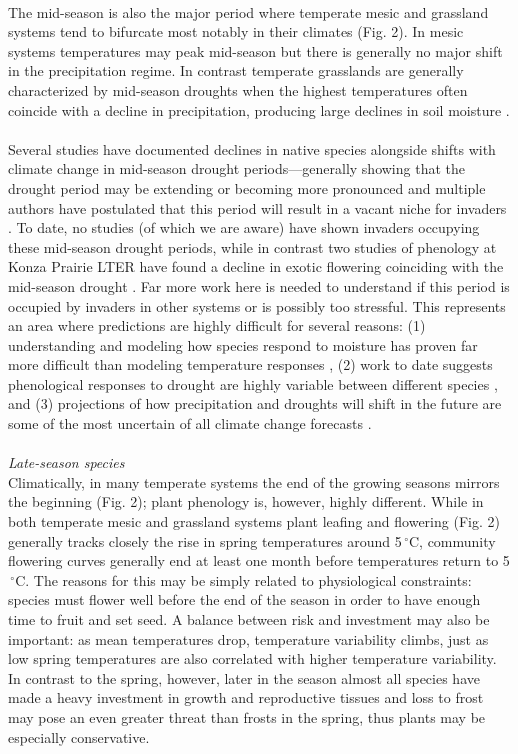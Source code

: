 \documentclass[11pt,a4paper,oneside]{article}
\begin{document}
\\
The mid-season is also the major period where temperate mesic and grassland systems tend to bifurcate most notably in their climates (Fig. 2). In mesic systems temperatures may peak mid-season but there is generally no major shift in the precipitation regime. In contrast temperate grasslands are generally characterized by mid-season droughts when the highest temperatures often coincide with a decline in precipitation, producing large declines in soil moisture \citep[e.g.,][]{Craine:2012kl}.\\
\\
Several studies have documented declines in native species alongside shifts with climate change in mid-season drought periods---generally showing that the drought period may be extending or becoming more pronounced \citep{Aldridge:2011} and multiple authors have postulated that this period will result in a vacant niche for invaders \citep{Sherry:2007fq,Aldridge:2011}. To date, no studies (of which we are aware) have shown invaders occupying these mid-season drought periods, while in contrast two studies of phenology at Konza Prairie LTER have found a decline in exotic flowering coinciding with the mid-season drought \citep{Craine:2012kl,wolkovichAmBot2013}. Far more work here is needed to understand if this period is occupied by invaders in other systems or is possibly too stressful. This represents an area where predictions are highly difficult for several reasons: (1) understanding and modeling how species respond to moisture has proven far more difficult than modeling temperature responses \citep{Crimmins:2011lq,wolkovichAmBot2013}, (2) work to date suggests phenological responses to drought are highly variable between different species \citep{Jentsch:2009ff,Prieto:2009fu}, and (3) projections of how precipitation and droughts will shift in the future are some of the most uncertain of all climate change forecasts \citep{knutti2013}.\\
\\
\noindent \emph{Late-season species}\\
Climatically, in many temperate systems the end of the growing seasons mirrors the beginning (Fig. 2); plant phenology is, however, highly different. While in both temperate mesic and grassland systems plant leafing and flowering (Fig. 2) generally tracks closely the rise in spring temperatures around 5$\,^{\circ}\mathrm{C}$, community flowering curves generally end at least one month before temperatures return to 5$\,^{\circ}\mathrm{C}$. The reasons for this may be simply related to physiological constraints: species must flower well before the end of the season in order to have enough time to fruit and set seed. A balance between risk and investment may also be important: as mean temperatures drop, temperature variability climbs, just as low spring temperatures are also correlated with higher temperature variability. In contrast to the spring, however, later in the season almost all species have made a heavy investment in growth and reproductive tissues and loss to frost may pose an even greater threat than frosts in the spring, thus plants may be especially conservative. \\
\end{document}
